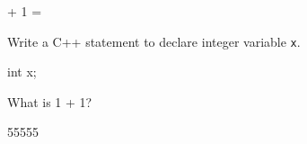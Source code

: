 

\renewcommand\AUTHOR{jdoe5@cougars.ccis.edu} %


\topmattertwo

 + 1 = 

\nextq
Write a C++ statement to declare integer variable \verb!x!.
\\
\ANSWER
\begin{answercode}

int x;

\end{answercode}

\nextq
What is 1 + 1?
\\
\ANSWER
\begin{answerlong}
55555
\end{answerlong}

\newpage


